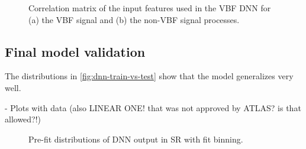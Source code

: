

\begin{figure}[t]
    \caption{Correlation matrix of the input features used in the VBF DNN for (a) the VBF signal and (b) the non-VBF signal processes.}
    \label{fig:dnn-features-correlations}
\end{figure}



\subsection{Final model validation}

The distributions in \cref{fig:dnn-train-vs-test} show that the model generalizes very well.

- Plots with data (also LINEAR ONE! that was not approved by ATLAS? is that allowed?!)


\begin{figure}[ht]
    \centering
    {\caption{Pre-fit distributions of DNN output in SR with fit binning.
            \label{fig:dnn:dnn-val-in-crs} }}
\end{figure}


